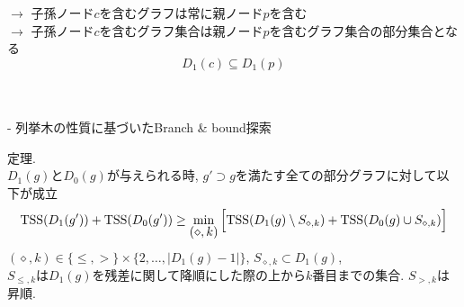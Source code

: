\begin{tcolorbox}[colbacktitle=gray, title={\fontsize{35pt}{0pt}\selectfont 内部ノードにおける分割ルールの学習}]
	\vspace{10pt}
	$\rightarrow$ 子孫ノード$c$を含むグラフは常に親ノード$p$を含む \\
	$\rightarrow$ 子孫ノード$c$を含むグラフ集合は親ノード$p$を含むグラフ集合の部分集合となる \\
	\begin{equation}
		D_1(c) \subseteq D_1(p)
	\end{equation}

	\vspace*{15pt}
	 \\
	\vspace{10pt}\\
	- 列挙木の性質に基づいたBranch \& bound探索

	\vspace*{30pt}
	定理.\\
	$D_1(g)$と$D_0(g)$が与えられる時, $g' \supset g$を満たす全ての部分グラフに対して以下が成立
	\begin{eqnarray*}
		\TSS(D_1(g')) + \TSS(D_0(g')) \geq 
		\mymin{(\diamond,k)} \Big[\TSS(D_1(g) \setminus S_{\diamond, k}) + \TSS(D_0(g) \cup S_{\diamond, k}) \Big]
	\end{eqnarray*}
	$ (\diamond, k) \in \{ \leq, > \} \times \{ 2, \dots, |D_1(g) - 1| \} $,
	$S_{\diamond, k} \subset D_1(g)$,\\
	$S_{\leq, k}$は$D_1(g)$を残差に関して降順にした際の上から$k$番目までの集合.
	$S_{>, k}$は昇順.
\end{tcolorbox}
